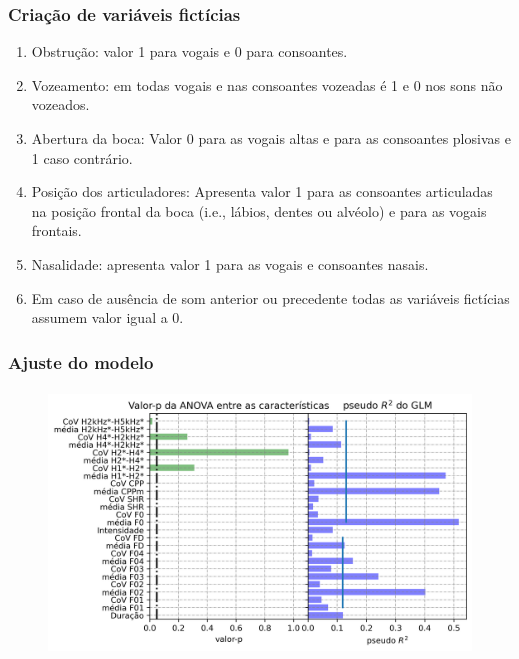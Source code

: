 \documentclass[121pt, aspectratio=169, t]{beamer}
\begin{document}
\begin{frame}[fragile=singleslide]
	\frametitle{Criação de variáveis fictícias}

	\begin{enumerate}
		\item Obstrução: valor 1 para vogais e 0 para consoantes.
		\item Vozeamento: em todas vogais e nas consoantes vozeadas é 1 e 0 nos sons não
		vozeados.
		\item Abertura da boca: Valor 0 para as vogais altas e para as consoantes plosivas e 1 caso contrário.
		\item Posição dos articuladores: Apresenta valor 1 para as consoantes articuladas na posição frontal da boca (i.e., lábios, dentes ou alvéolo) e para as vogais frontais.
		\item Nasalidade: apresenta valor 1 para as vogais e consoantes nasais.
		\item Em caso de ausência de som anterior ou precedente todas as variáveis fictícias assumem valor igual a 0.
	\end{enumerate}
\end{frame}

\begin{frame}[fragile=singleslide]
	\frametitle{Ajuste do modelo}
	\begin{figure}
		\centering
		\includegraphics[height=7cm]{pValue_ANOVA_features.png}
	\end{figure}

\end{frame}
\end{document}

